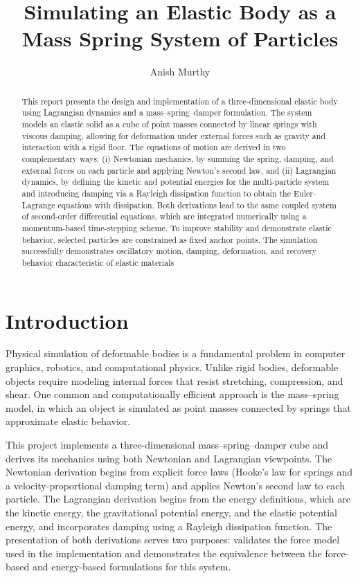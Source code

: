 \documentclass[manuscript,nonacm,12pt,letterpaper]{acmart}
\author{Anish Murthy}
\affiliation{\institution{DigiPen Institute of Technology, Redmond}}
\title{Simulating an Elastic Body as a Mass Spring System of Particles}
\begin{document}
\graphicspath{ {./images/} }

\begin{abstract}
This report presents the design and implementation of a three-dimensional elastic body using Lagrangian dynamics and a mass–spring–damper formulation. The system models an elastic solid as a cube of point masses connected by linear springs with viscous damping, allowing for deformation under external forces such as gravity and interaction with a rigid floor. The equations of motion are derived in two complementary ways: (i) Newtonian mechanics, by summing the spring, damping, and external forces on each particle and applying Newton’s second law, and (ii) Lagrangian dynamics, by defining the kinetic and potential energies for the multi-particle system and introducing damping via a Rayleigh dissipation function to obtain the Euler–Lagrange equations with dissipation. Both derivations lead to the same coupled system of second-order differential equations, which are integrated numerically using a momentum-based time-stepping scheme. To improve stability and demonstrate elastic behavior, selected particles are constrained as fixed anchor points. The simulation successfully demonstrates oscillatory motion, damping, deformation, and recovery behavior characteristic of elastic materials
\end{abstract}
\maketitle

\section{Introduction}
\label{Sec1:Intro}
Physical simulation of deformable bodies is a fundamental problem in computer graphics, robotics, and computational physics. Unlike rigid bodies, deformable objects require modeling internal forces that resist stretching, compression, and shear. One common and computationally efficient approach is the mass–spring model, in which an object is simulated as point masses connected by springs that approximate elastic behavior.

This project implements a three-dimensional mass–spring–damper cube and derives its mechanics using both Newtonian and Lagrangian viewpoints. The Newtonian derivation begins from explicit force laws (Hooke’s law for springs and a velocity-proportional damping term) and applies Newton’s second law to each particle. The Lagrangian derivation begins from the energy definitions, which are the kinetic energy, the gravitational potential energy, and the elastic potential energy, and incorporates damping using a Rayleigh dissipation function. The presentation of both derivations serves two purposes: validates the force model used in the implementation and demonstrates the equivalence between the force-based and energy-based formulations for this system.
\end{document}
